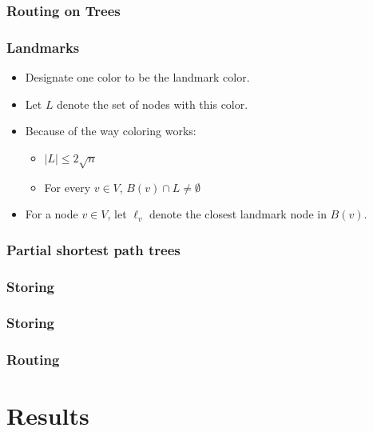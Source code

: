 \documentclass[10pt, compress]{beamer}
\begin{document}
\begin{frame}[fragile]
  \frametitle{Routing on Trees}


\end{frame}

\begin{frame}[fragile]
  \frametitle{Landmarks}
  \begin{itemize}
    \item Designate one color to be the landmark color.
    \item Let $L$ denote the set of nodes with this color.
    \item Because of the way coloring works:
    \begin{itemize}
        \item $|L| \leq 2 \sqrt{n}$
        \item For every $v\in V$, $B(v)\cap L \neq \emptyset$
    \end{itemize}
    \item For a node $v\in V$, let $\ell_v$ denote the closest landmark node in $B(v)$.
  \end{itemize}

\end{frame}

\begin{frame}[fragile]
  \frametitle{Partial shortest path trees}


\end{frame}

\begin{frame}[fragile]
  \frametitle{Storing}


\end{frame}

\begin{frame}[fragile]
  \frametitle{Storing}


\end{frame}

\begin{frame}[fragile]
  \frametitle{Routing}


\end{frame}


\section{Results}
\end{document}
